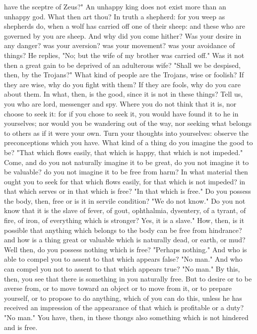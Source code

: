 \documentclass[a4paper]{article}
\begin{document}
have the sceptre of Zeus?" An unhappy king does not exist more than an unhappy
god. What then art thou? In truth a shepherd: for you weep as shepherds do,
when a wolf has carried off one of their sheep: and these who are governed by
you are sheep. And why did you come hither? Was your desire in any danger? was
your aversion? was your movement? was your avoidance of things? He replies,
"No; but the wife of my brother was carried off." Was it not then a great gain
to be deprived of an adulterous wife? "Shall we be despised, then, by the
Trojans?" What kind of people are the Trojans, wise or foolish? If they are
wise, why do you fight with them? If they are fools, why do you care about
them.
    In what, then, is the good, since it is not in these things? Tell us, you
who are lord, messenger and spy. Where you do not think that it is, nor choose
to seek it: for if you chose to seek it, you would have found it to he in
yourselves; nor would you be wandering out of the way, nor seeking what belongs
to others as if it were your own. Turn your thoughts into yourselves: observe
the preconceptions which you have. What kind of a thing do you imagine the good
to be? "That which flows easily, that which is happy, that which is not
impeded." Come, and do you not naturally imagine it to be great, do you not
imagine it to be valuable? do you not imagine it to be free from harm? In what
material then ought you to seek for that which flows easily, for that which is
not impeded? in that which serves or in that which is free? "In that which is
free." Do you possess the body, then, free or is it in servile condition? "We
do not know." Do you not know that it is the slave of fever, of gout,
ophthalmia, dysentery, of a tyrant, of fire, of iron, of everything which is
stronger? Yes, it is a slave." How, then, is it possible that anything which
belongs to the body can be free from hindrance? and how is a thing great or
valuable which is naturally dead, or earth, or mud? Well then, do you possess
nothing which is free? "Perhaps nothing." And who is able to compel you to
assent to that which appears false? "No man." And who can compel you not to
assent to that which appears true? "No man." By this, then, you see that there
is something in you naturally free. But to desire or to be averse from, or to
move toward an object or to move from it, or to prepare yourself, or to propose
to do anything, which of you can do this, unless he has received an impression
of the appearance of that which is profitable or a duty? "No man." You have,
then, in these thongs also something which is not hindered and is free.
\end{document}
